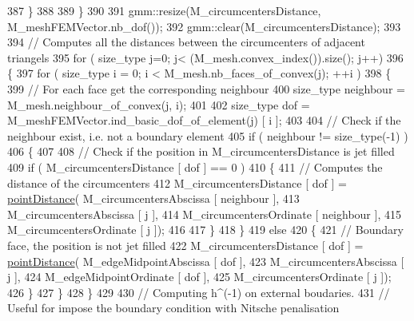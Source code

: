 \begin{DoxyCode}
387         \}
388     
389     \}
390     
391     gmm::resize(M\_circumcentersDistance, M\_meshFEMVector.nb\_dof());
392     gmm::clear(M\_circumcentersDistance);
393 
394     \textcolor{comment}{// Computes all the distances between the circumcenters of adjacent triangels}
395     \textcolor{keywordflow}{for} ( size\_type j=0; j< (M\_mesh.convex\_index()).size(); j++)
396     \{
397         \textcolor{keywordflow}{for} ( size\_type i = 0; i < M\_mesh.nb\_faces\_of\_convex(j); ++i )
398         \{
399             \textcolor{comment}{// For each face get the corresponding neighbour}
400             size\_type neighbour = M\_mesh.neighbour\_of\_convex(j, i);
401 
402             size\_type dof = M\_meshFEMVector.ind\_basic\_dof\_of\_element(j) [ i ];
403  
404             \textcolor{comment}{// Check if the neighbour exist, i.e. not a boundary element}
405             \textcolor{keywordflow}{if} ( neighbour != size\_type(-1) )
406             \{
407 
408                 \textcolor{comment}{// Check if the position in M\_circumcentersDistance is jet filled}
409                 \textcolor{keywordflow}{if} ( M\_circumcentersDistance [ dof ] == 0 )
410                 \{
411                     \textcolor{comment}{// Computes the distance of the circumcenters}
412                     M\_circumcentersDistance [ dof ] = \hyperlink{UsefulFunctions_8h_ad9cf8f3fe42287349e8e1b2f1f824958}{pointDistance}( M\_circumcentersAbscissa [
       neighbour ],
413                                                                      M\_circumcentersAbscissa [ j ],
414                                                                      M\_circumcentersOrdinate [ neighbour ],
415                                                                      M\_circumcentersOrdinate [ j ]);
416 
417                 \}
418             \}
419             \textcolor{keywordflow}{else}
420             \{
421                 \textcolor{comment}{// Boundary face, the position is not jet filled}
422                 M\_circumcentersDistance [ dof ] = \hyperlink{UsefulFunctions_8h_ad9cf8f3fe42287349e8e1b2f1f824958}{pointDistance}( M\_edgeMidpointAbscissa [ dof 
      ],
423                                                                  M\_circumcentersAbscissa [ j ],
424                                                                  M\_edgeMidpointOrdinate [ dof ],
425                                                                  M\_circumcentersOrdinate [ j ]);
426             \}
427         \}
428     \}
429 
430     \textcolor{comment}{// Computing h^(-1) on external boudaries.}
431     \textcolor{comment}{// Useful for impose the boundary condition with Nitsche penalisation}

\end{DoxyCode}

